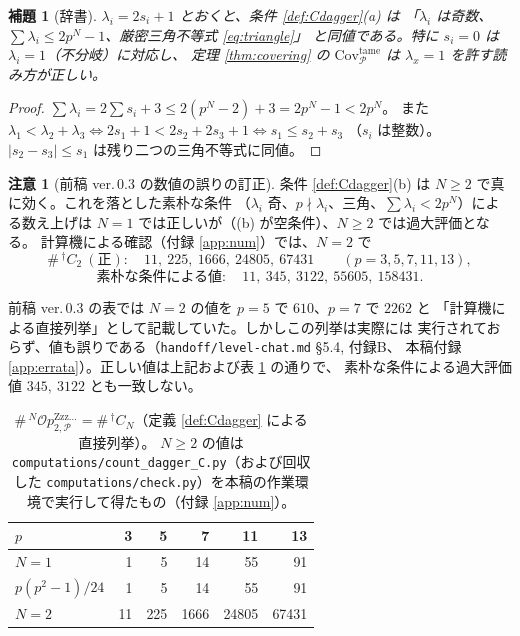 \documentclass[a4paper,11pt]{ltjsarticle}
\theoremstyle{plain}
\newtheorem{lemma}[theorem]{補題}
\theoremstyle{definition}
\newtheorem{remark}[theorem]{注意}
\newcommand{\sP}{\mathscr{P}}
\newcommand{\Op}{\mathcal{O}p}
\newcommand{\Zzz}{\mathrm{Zzz\dots}}
\begin{document}
\begin{lemma}[辞書]\label{lem:dict}
$\lambda_i=2s_i+1$ とおくと、条件 \ref{def:Cdagger}(a) は
「$\lambda_i$ は奇数、$\sum\lambda_i\le 2p^N-1$、厳密三角不等式 \eqref{eq:triangle}」
と同値である。特に $s_i=0$ は $\lambda_i=1$（不分岐）に対応し、
定理 \ref{thm:covering} の $\mathrm{Cov}^{\mathrm{tame}}_{\sP}$ は
$\lambda_x=1$ を許す読み方が正しい。
\end{lemma}

\begin{proof}
$\sum\lambda_i=2\sum s_i+3\le 2(p^N-2)+3=2p^N-1<2p^N$。
また $\lambda_1<\lambda_2+\lambda_3\iff 2s_1+1<2s_2+2s_3+1\iff s_1\le s_2+s_3$
（$s_i$ は整数）。$|s_2-s_3|\le s_1$ は残り二つの三角不等式に同値。
\end{proof}

\begin{remark}[前稿 ver.\,0.3 の数値の誤りの訂正]\label{rem:erratum}
条件 \ref{def:Cdagger}(b) は $N\ge2$ で真に効く。これを落とした素朴な条件
（$\lambda_i$ 奇、$p\nmid\lambda_i$、三角、$\sum\lambda_i<2p^N$）による数え上げは
$N=1$ では正しいが（(b) が空条件）、$N\ge2$ では過大評価となる。
計算機による確認（付録 \ref{app:num}）では、$N=2$ で
\[
  \#\,{}^{\dagger}C_2\ (\text{正}):\quad 11,\ 225,\ 1666,\ 24805,\ 67431
  \qquad(p=3,5,7,11,13),
\]
\[
  \text{素朴な条件による値}:\quad 11,\ 345,\ 3122,\ 55605,\ 158431 .
\]

前稿 ver.\,0.3 の表では $N=2$ の値を $p=5$ で $610$、$p=7$ で $2262$ と
「計算機による直接列挙」として記載していた。しかしこの列挙は実際には
実行されておらず、値も誤りである（\texttt{handoff/level-chat.md} \S5.4, 付録B、
本稿付録 \ref{app:errata}）。正しい値は上記および表 \ref{tab:count} の通りで、
素朴な条件による過大評価値 $345,\ 3122$ とも一致しない。
\end{remark}

\begin{table}[htbp]
\centering
\caption{$\#\,{}^N\Op^{\Zzz}_{2,\sP}=\#\,{}^{\dagger}C_N$（定義 \ref{def:Cdagger} による直接列挙）。
$N\ge2$ の値は \texttt{computations/count\_dagger\_C.py}（および回収した
\texttt{computations/check.py}）を本稿の作業環境で実行して得たもの（付録 \ref{app:num}）。}
\label{tab:count}
\begin{tabular}{lrrrrr}
\toprule
$p$ & 3 & 5 & 7 & 11 & 13\\
\midrule
$N=1$ & 1 & 5 & 14 & 55 & 91\\
$p(p^2-1)/24$ & 1 & 5 & 14 & 55 & 91\\
$N=2$ & 11 & 225 & 1666 & 24805 & 67431\\
\bottomrule
\end{tabular}
\end{table}
\end{document}
